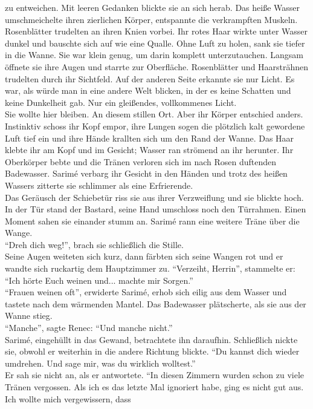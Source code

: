 zu entweichen. Mit leeren Gedanken blickte sie an sich herab. Das heiße Wasser umschmeichelte ihren 
zierlichen Körper, entspannte die verkrampften Muskeln. Rosenblätter trudelten an ihren Knien 
vorbei. Ihr rotes Haar wirkte unter Wasser dunkel und bauschte sich auf wie eine Qualle. Ohne Luft 
zu holen, sank sie tiefer in die Wanne. Sie war klein genug, um darin komplett unterzutauchen. 
Langsam öffnete sie ihre Augen und starrte zur Oberfläche. Rosenblätter und Haarsträhnen trudelten 
durch ihr Sichtfeld. Auf der anderen Seite erkannte sie nur Licht. Es war, als würde man in eine 
andere Welt blicken, in der es keine Schatten und keine Dunkelheit gab. Nur ein gleißendes, 
vollkommenes Licht. \\
Sie wollte hier bleiben. An diesem stillen Ort. Aber ihr Körper entschied anders. Instinktiv schoss 
ihr Kopf empor, ihre Lungen sogen die plötzlich kalt gewordene Luft tief ein und ihre Hände 
krallten sich um den Rand der Wanne. Das Haar klebte ihr am Kopf und im Gesicht; Wasser ran 
strömend an ihr herunter. Ihr Oberkörper bebte und die Tränen verloren sich im nach Rosen duftenden 
Badewasser. Sarimé verbarg ihr Gesicht in den Händen und trotz des heißen Wassers zitterte sie 
schlimmer als eine Erfrierende.\\
Das Geräusch der Schiebetür riss sie aus ihrer Verzweiflung und sie blickte hoch. In der Tür stand 
der Bastard, seine Hand umschloss noch den Türrahmen. Einen Moment sahen sie einander stumm an. 
Sarimé rann eine weitere Träne über die Wange.\\
``Dreh dich weg!'', brach sie schließlich die Stille.\\
Seine Augen weiteten sich kurz, dann färbten sich seine Wangen rot und er wandte sich ruckartig dem 
Hauptzimmer zu. ``Verzeiht, Herrin'', stammelte er: ``Ich hörte Euch weinen und... machte mir 
Sorgen.''\\
``Frauen weinen oft'', erwiderte Sarimé, erhob sich eilig aus dem Wasser und tastete nach dem 
wärmenden Mantel. Das Badewasser plätscherte, als sie aus der Wanne stieg.\\
``Manche'', sagte Renec: ``Und manche nicht.''\\
Sarimé, eingehüllt in das Gewand, betrachtete ihn daraufhin. Schließlich nickte sie, obwohl er 
weiterhin in die andere Richtung blickte. ``Du kannst dich wieder umdrehen. Und sage mir, was du 
wirklich wolltest.''\\
Er sah sie nicht an, als er antwortete. ``In diesen Zimmern wurden schon zu viele Tränen vergossen. 
Als ich es das letzte Mal ignoriert habe, ging es nicht gut aus. Ich wollte mich vergewissern, dass 
